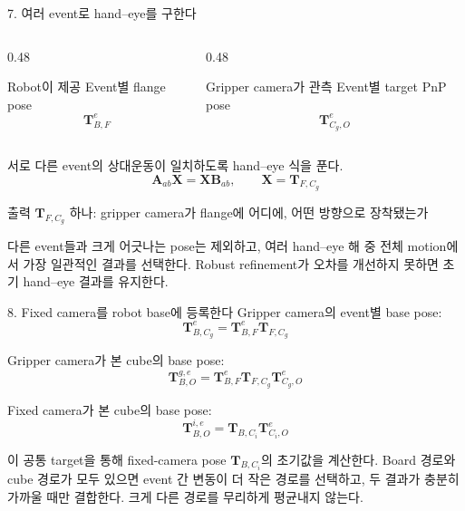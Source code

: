 \documentclass[aspectratio=169,11pt]{beamer}
\newcommand{\T}[2]{\mathbf T_{#1,#2}}
\begin{document}
\begin{frame}{7. 여러 event로 hand--eye를 구한다}
  \begin{columns}[T]
    \begin{column}{0.48\textwidth}
      \begin{block}{Robot이 제공}
        Event별 flange pose
        \[
          \T{B}{F}^{e}
        \]
      \end{block}
    \end{column}
    \begin{column}{0.48\textwidth}
      \begin{block}{Gripper camera가 관측}
        Event별 target PnP pose
        \[
          \T{C_g}{O}^{e}
        \]
      \end{block}
    \end{column}
  \end{columns}

  \vfill
  서로 다른 event의 상대운동이 일치하도록 hand--eye 식을 푼다.
  \[
    \mathbf A_{ab}\mathbf X=\mathbf X\mathbf B_{ab},
    \qquad \mathbf X=\T{F}{C_g}
  \]

  \begin{alertblock}{출력}
    $\T{F}{C_g}$ 하나: gripper camera가 flange에 어디에, 어떤 방향으로 장착됐는가
  \end{alertblock}

  \small
  다른 event들과 크게 어긋나는 pose는 제외하고, 여러 hand--eye 해 중 전체 motion에서 가장 일관적인 결과를
  선택한다. Robust refinement가 오차를 개선하지 못하면 초기 hand--eye 결과를 유지한다.
\end{frame}

\begin{frame}{8. Fixed camera를 robot base에 등록한다}
  Gripper camera의 event별 base pose:
  \[
    \T{B}{C_g}^{e}=\T{B}{F}^{e}\T{F}{C_g}
  \]

  Gripper camera가 본 cube의 base pose:
  \[
    \T{B}{O}^{g,e}
    =\T{B}{F}^{e}\T{F}{C_g}\T{C_g}{O}^{e}
  \]

  Fixed camera가 본 cube의 base pose:
  \[
    \T{B}{O}^{i,e}
    =\T{B}{C_i}\T{C_i}{O}^{e}
  \]

  \vfill
  이 공통 target을 통해 fixed-camera pose $\T{B}{C_i}$의 초기값을 계산한다. Board 경로와 cube 경로가 모두
  있으면 event 간 변동이 더 작은 경로를 선택하고, 두 결과가 충분히 가까울 때만 결합한다. 크게 다른 경로를
  무리하게 평균내지 않는다.
\end{frame}
\end{document}
